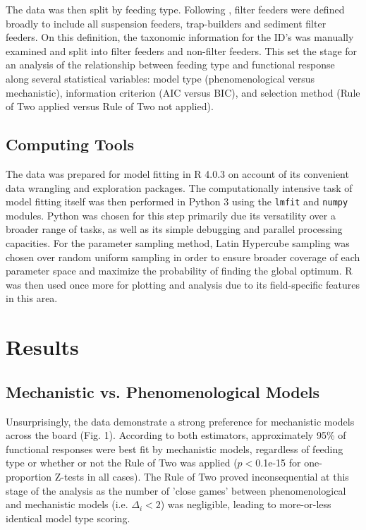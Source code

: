 \documentclass[11pt]{article}
\begin{document}
    The data was then split by feeding type. Following \citet{jeschke2004consumer}, filter feeders were defined broadly to include all suspension feeders, trap-builders and sediment filter feeders. On this definition, the taxonomic information for the ID's was manually examined and split into filter feeders and non-filter feeders. This set the stage for an analysis of the relationship between feeding type and functional response along several statistical variables: model type (phenomenological versus mechanistic), information criterion (AIC versus BIC), and selection method (Rule of Two applied versus Rule of Two not applied). 
    
    \subsection{Computing Tools}
    
    The data was prepared for model fitting in R 4.0.3 on account of its convenient data wrangling and exploration packages. The computationally intensive task of model fitting itself was then performed in Python 3 using the \texttt{lmfit} and \texttt{numpy} modules. Python was chosen for this step primarily due its versatility over a broader range of tasks, as well as its simple debugging and parallel processing capacities. For the parameter sampling method, Latin Hypercube sampling was chosen over random uniform sampling in order to ensure broader coverage of each parameter space and maximize the probability of finding the global optimum. 
    R was then used once more for plotting and analysis due to its field-specific features in this area.

    \section{Results}
    \subsection{Mechanistic vs. Phenomenological Models}
    
    Unsurprisingly, the data demonstrate a strong preference for mechanistic models across the board (Fig. 1). According to both estimators, approximately 95\% of functional responses were best fit by mechanistic models, regardless of feeding type or whether or not the Rule of Two was applied ($p<$0.1e-15 for one-proportion Z-tests in all cases). The Rule of Two proved inconsequential at this stage of the analysis as the number of 'close games' between phenomenological and mechanistic models (i.e. $\Delta_i<2$) was negligible, leading to more-or-less identical model type scoring.
    
\end{document}
